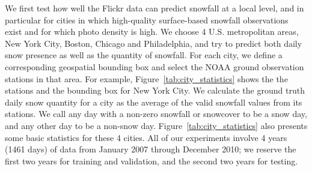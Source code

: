 



We first test how well the Flickr data can predict snowfall at a local
level, and in particular for cities in which high-quality
surface-based snowfall observations exist and for which photo density is high.
%
%
We choose 4 U.S. metropolitan areas, New York City, Boston, Chicago and
Philadelphia, and try to predict both daily snow presence as well as
the quantity of snowfall.  For each city, we define a corresponding
geospatial bounding box and select the NOAA ground observation stations in that area. 
For example, 
Figure~\ref{tab:city_statistics} shows the the stations 
and the bounding box for 
New York City. We calculate the ground truth daily snow quantity for a city as the average of
the valid 
snowfall values from its stations.
We call any day with a non-zero snowfall or snowcover to be a snow day,
and any other day to be a non-snow day.
Figure~\ref{tab:city_statistics} also presents some basic statistics for
these 4 cities.  All of our experiments involve 4 years (1461 days) of
data from January 2007 through December 2010; we reserve the first two
years for training and validation, and the second two years for
testing.

